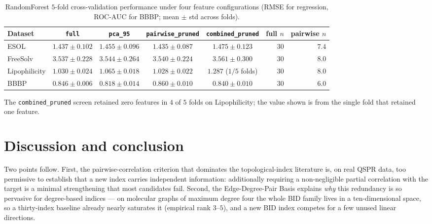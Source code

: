 \documentclass[11pt,a4paper]{article}
\theoremstyle{definition}
\begin{document}
\begin{table}[h]
\centering
\small
\caption{RandomForest $5$-fold cross-validation performance under four feature configurations (RMSE for regression, ROC-AUC for BBBP; mean $\pm$ std across folds).}
\label{tab:ml_benchmark}
\begin{tabular}{lccccrr}
\toprule
Dataset & \texttt{full} & \texttt{pca\_95} & \texttt{pairwise\_pruned} & \texttt{combined\_pruned} & full $n$ & pairwise $n$\\
\midrule
ESOL          & $1.437 \pm 0.102$ & $1.455 \pm 0.096$ & $1.435 \pm 0.087$ & $1.475 \pm 0.123$ & $30$ & $7.4$\\
FreeSolv      & $3.537 \pm 0.228$ & $3.544 \pm 0.264$ & $3.540 \pm 0.224$ & $3.561 \pm 0.300$ & $30$ & $8.0$\\
Lipophilicity & $1.030 \pm 0.024$ & $1.065 \pm 0.018$ & $1.028 \pm 0.022$ & $1.287$ ($1/5$ folds) & $30$ & $8.0$\\
BBBP          & $0.846 \pm 0.006$ & $0.818 \pm 0.014$ & $0.860 \pm 0.010$ & $0.840 \pm 0.010$ & $30$ & $6.0$\\
\bottomrule
\end{tabular}

\vspace{0.4em}
\noindent\small{The \texttt{combined\_pruned} screen retained zero features in $4$ of $5$ folds on Lipophilicity; the value shown is from the single fold that retained one feature.}
\end{table}

\section{Discussion and conclusion}

Two points follow. First, the pairwise-correlation criterion that
dominates the topological-index literature is, on real QSPR data,
too permissive to establish that a new index carries independent
information: additionally requiring a non-negligible partial
correlation with the target is a minimal strengthening that most
candidates fail. Second, the Edge-Degree-Pair Basis explains
\emph{why} this redundancy is so pervasive for degree-based
indices --- on molecular graphs of maximum degree four the whole
BID family lives in a ten-dimensional space, so a thirty-index
baseline already nearly saturates it (empirical rank $3$--$5$), and
a new BID index competes for a few unused linear directions.
\end{document}
